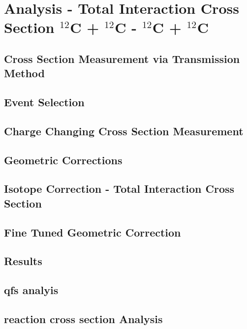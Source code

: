 \section{Analysis - Total Interaction Cross Section $^{12}$C + $^{12}$C - $^{12}$C + $^{12}$C}
\subsection{Cross Section Measurement via Transmission Method}
\subsection{Event Selection}
\subsection{Charge Changing Cross Section Measurement}
\subsection{Geometric Corrections}
\subsection{Isotope Correction - Total Interaction Cross Section}
\subsection{Fine Tuned Geometric Correction}
\subsection{Results}




\subsection{qfs analyis}
\subsection{reaction cross section Analysis}

